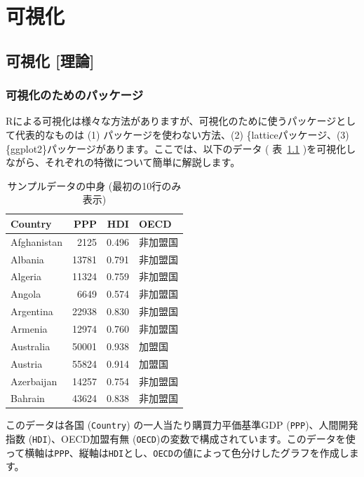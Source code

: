 \documentclass[
  a4paper,
  pandoc,
  ja=standard,
  jafont=haranoaji]{bxjsbook}
\begin{document}
\part{可視化}

\hypertarget{sec-visualization1}{%
\chapter{可視化 {[}理論{]}}\label{sec-visualization1}}

\hypertarget{sec-visual1_packages}{%
\section{可視化のためのパッケージ}\label{sec-visual1_packages}}

Rによる可視化は様々な方法がありますが、可視化のために使うパッケージとして代表的なものは
(1) パッケージを使わない方法、(2) \{latticeパッケージ、(3)
\{ggplot2\}パッケージがあります。ここでは、以下のデータ (
表~\ref{tbl-visual1_sampledata}
)を可視化しながら、それぞれの特徴について簡単に解説します。

\hypertarget{tbl-visual1_sampledata}{}
\begin{table}
\caption{\label{tbl-visual1_sampledata}サンプルデータの中身 (最初の10行のみ表示) }

\centering
\begin{tabular}{l|r|r|l}
\hline
Country & PPP & HDI & OECD\\
\hline
Afghanistan & 2125 & 0.496 & 非加盟国\\
\hline
Albania & 13781 & 0.791 & 非加盟国\\
\hline
Algeria & 11324 & 0.759 & 非加盟国\\
\hline
Angola & 6649 & 0.574 & 非加盟国\\
\hline
Argentina & 22938 & 0.830 & 非加盟国\\
\hline
Armenia & 12974 & 0.760 & 非加盟国\\
\hline
Australia & 50001 & 0.938 & 加盟国\\
\hline
Austria & 55824 & 0.914 & 加盟国\\
\hline
Azerbaijan & 14257 & 0.754 & 非加盟国\\
\hline
Bahrain & 43624 & 0.838 & 非加盟国\\
\hline
\end{tabular}
\end{table}

このデータは各国 (\texttt{Country}) の一人当たり購買力平価基準GDP
(\texttt{PPP})、人間開発指数 (\texttt{HDI})、OECD加盟有無
(\texttt{OECD})の変数で構成されています。このデータを使って横軸は\texttt{PPP}、縦軸は\texttt{HDI}とし、\texttt{OECD}の値によって色分けしたグラフを作成します。
\end{document}
